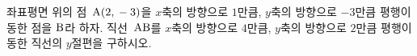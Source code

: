 좌표평면 위의 점~$\mathrm{A}(2{,}\mkern3mu -3)$을 $x$축의 방향으로 $1$만큼, $y$축의 방향으로 $-3$만큼 평행이동한 점을 $\mathrm{B}$라 하자. 직선~$\mathrm{AB}$를 $x$축의 방향으로 $4$만큼, $y$축의 방향으로 $2$만큼 평행이동한 직선의 $y$절편을 구하시오.
